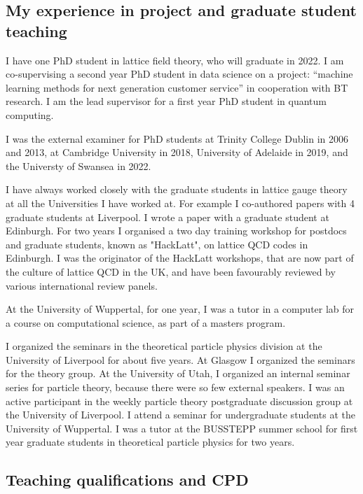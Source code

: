 \documentclass[12pt]{article}
\begin{document}
\subsection{My experience in project and graduate student teaching}

I have one PhD student in lattice field theory, who will graduate in
2022. I am co-supervising a second year PhD student in data science on
a project: ``machine learning methods for next generation customer
service'' in cooperation with BT research. I am the lead supervisor
for a first year PhD student in quantum computing.


I was the external examiner for PhD students
at Trinity College Dublin in 2006 and 2013,
at Cambridge University in 2018,
University of Adelaide in 2019, 
and the Universty of Swansea in 2022.


I have always worked closely with the graduate students in lattice
gauge theory at all the Universities I have worked at.  For example I
co-authored papers with 4 graduate students at Liverpool. I wrote a
paper with a graduate student at Edinburgh.  For two years I organised
a two day training workshop for postdocs and graduate students, known
as "HackLatt", on lattice QCD codes in Edinburgh. I was the originator
of the HackLatt workshops, that are now part of the culture of lattice
QCD in the UK, and have been favourably reviewed by various
international review panels.


At the University of Wuppertal, for one year, I was a tutor in
a computer lab for a course on computational 
science, as part of a masters program.


I organized the seminars in the theoretical particle physics division
at the University of Liverpool for about five years. At Glasgow I
organized the seminars for the theory group.  At the University of
Utah, I organized an internal seminar series for particle theory,
because there were so few external speakers.
I was an active
participant in the weekly particle theory postgraduate discussion
group at the University of Liverpool.
I attend a seminar for undergraduate students at the University
of Wuppertal.
I was a tutor at the BUSSTEPP summer school for first year
graduate students in theoretical particle physics for two years.



\subsection{Teaching qualifications and CPD}
\end{document}

